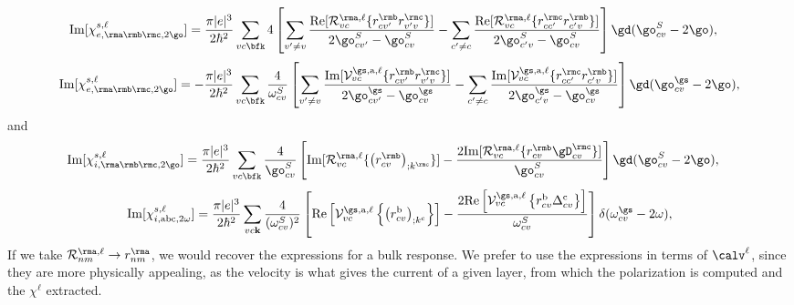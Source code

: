 \begin{align}\label{imchie2w}
\mathrm{Im}[\chi_{e,\rma\rmb\rmc,2\go}^{s,\ell}]
&=
\frac{\pi |e|^3}{2\hbar^2} 
\sum_{vc\bfk} 
4
\left[
\sum_{v'\ne v}
\frac{\mathrm{Re}[{\cal
    R}^{\rma,\ell}_{vc}\{r^{\rmb}_{cv'}r^{\rmc}_{v'v}\}]}{2\go^S_{cv'}-\go^S_{cv}}
-
\sum_{c'\ne c}
\frac{\mathrm{Re}[{\cal R}^{\rma,\ell}_{vc}\{r^{\rmc}_{cc'}r^{\rmb}_{c'v}\}]}
{2\go^S_{c'v}-\go^S_{cv}}
\right]
\gd(\go^S_{cv}-2\go)
,
\end{align}  
\begin{equation}\label{c-calvimchie2wn}
\mathrm{Im}[\chi_{e,\rma\rmb\rmc,2\go}^{s,\ell}] =
-\frac{\pi |e|^3}{2\hbar^2}\sum_{vc\bfk}\frac{4}{\omega^{S}_{cv}}
\left[
\sum_{v'\ne
  v}\frac{\mathrm{Im}[\mathcal{V}^{\gs,\text{a},\ell}_{vc}\{r^{\rmb}_{cv'}r^{\rmc}_{v'v}\}]}
{2\go^\gs_{cv'}-\go^\gs_{cv}}
- \sum_{c'\ne
  c}\frac{\mathrm{Im}[\mathcal{V}^{\gs,\text{a},\ell}_{vc}\{r^{\rmc}_{cc'}r^{\rmb}_{c'v}\}]}
{2\go^\gs_{c'v}-\go^\gs_{cv}}
\right]\gd(\go^\gs_{cv}-2\go),
\end{equation}
 and
\begin{align}\label{imchi2wf}
\mathrm{Im}[\chi_{i,\rma\rmb\rmc,2\go}^{s,\ell}]
&=
\frac{\pi|e|^3}{2\hbar^2}\sum_{vc\bfk}
\frac{4}{\go^S_{cv}}
\left[
\mathrm{Im}[{\cal R}^{\rma,\ell}_{vc}\{\left(r^{\rmb}_{cv}\right)_{;k^{\rmc}}\}]
-
\frac{2\mathrm{Im}[{\cal R}^{\rma,\ell}_{vc}\{r^{\rmb}_{cv}\gD^{\rmc}_{cv}\}]}{\go^S_{cv}}
\right]\gd(\go^S_{cv}-2\go)
,
\end{align}
\begin{equation}\label{c-calvimchi2wn}
\mathrm{Im}[\chi_{i,\text{a}\text{b}\text{c},2\omega}^{s,\ell}] 
=
 \frac{\pi \vert
   e\vert^{3}}{2\hbar^2}\sum_{vc\mathbf{k}}\frac{4}{(\omega^{S}_{cv})^{2}}
\left[\mathrm{Re}\left[\mathcal{V}^{\gs,\text{a},\ell}_{vc}\left\{\left(r^{\text{b}}_{cv}\right)_{;k^{\text{c}}}
\right\}\right] -
\frac{2\mathrm{Re}\left[\mathcal{V}^{\gs,\text{a},\ell}_{vc}\left\{r^{\text{b}}_{cv}
\Delta^{\text{c}}_{cv}\right\}\right]}{\omega^{S}_{cv}}\right]\delta(\omega^\gs_{cv}-2\omega)
,
\end{equation}
\noindent If we take ${\cal R}^{\rma,\ell}_{nm}\to r^\rma_{nm}$, 
we
would recover the expressions for a bulk response.
We prefer to use the expressions in terms of $\calv^\ell$, since they are
more physically appealing, as the velocity is what gives the current
of a given layer, from which the polarization is computed and the
$\chi^\ell$ extracted.   

